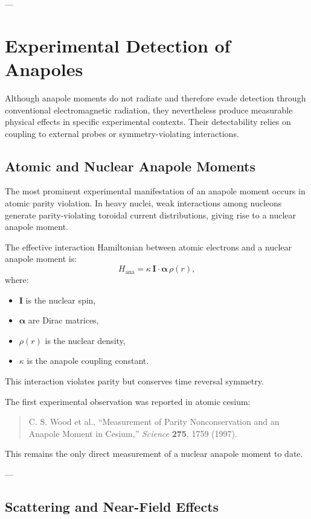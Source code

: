 \documentclass[11pt]{article}
\begin{document}
---
\section{Experimental Detection of Anapoles}

Although anapole moments do not radiate and therefore evade detection through conventional electromagnetic radiation, they nevertheless produce measurable physical effects in specific experimental contexts. Their detectability relies on coupling to external probes or symmetry-violating interactions.

\subsection{Atomic and Nuclear Anapole Moments}

The most prominent experimental manifestation of an anapole moment occurs in atomic parity violation. 
In heavy nuclei, weak interactions among nucleons generate parity-violating toroidal current distributions, giving rise to a nuclear anapole moment.

The effective interaction Hamiltonian between atomic electrons and a nuclear anapole moment is:
\begin{equation}
H_{\text{ana}} = \kappa \, \mathbf{I} \cdot \mathbf{\alpha} \, \rho(r),
\end{equation}
where:
\begin{itemize}
\item $\mathbf{I}$ is the nuclear spin,
\item $\mathbf{\alpha}$ are Dirac matrices,
\item $\rho(r)$ is the nuclear density,
\item $\kappa$ is the anapole coupling constant.
\end{itemize}

This interaction violates parity but conserves time reversal symmetry.

The first experimental observation was reported in atomic cesium:
\begin{quote}
C. S. Wood et al., ``Measurement of Parity Nonconservation and an Anapole Moment in Cesium,'' \textit{Science} \textbf{275}, 1759 (1997).
\end{quote}

This remains the only direct measurement of a nuclear anapole moment to date.

---

\subsection{Scattering and Near-Field Effects}
\end{document}
